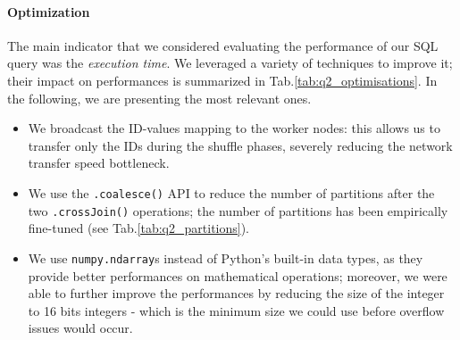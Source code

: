 \begin{figure}[H]
    \begin{minipage}{.45\textwidth}
        \centering
        
    \end{minipage}
    \hfill
    \begin{minipage}{.45\textwidth}
        \centering
        
    \end{minipage}
\end{figure}


\paragraph{\textbf{Optimization}}
The main indicator that we considered evaluating the performance of our SQL query was the \emph{execution time}. We leveraged a variety of techniques to improve it; their impact on performances is summarized in Tab.\ref{tab:q2_optimisations}. In the following, we are presenting the most relevant ones.
\begin{itemize}
    \item We broadcast the ID-values mapping to the worker nodes: this allows us to transfer only the IDs during the shuffle phases, severely reducing the network transfer speed bottleneck.
    \item We use the \texttt{.coalesce()} API to reduce the number of partitions after the two \texttt{.crossJoin()} operations; the number of partitions has been empirically fine-tuned (see Tab.\ref{tab:q2_partitions}).
    \item We use \texttt{numpy.ndarray}s instead of Python's built-in data types, as they provide better performances on mathematical operations; moreover, we were able to further improve the performances by reducing the size of the integer to 16 bits integers - which is the minimum size we could use before overflow issues would occur.
\end{itemize}
